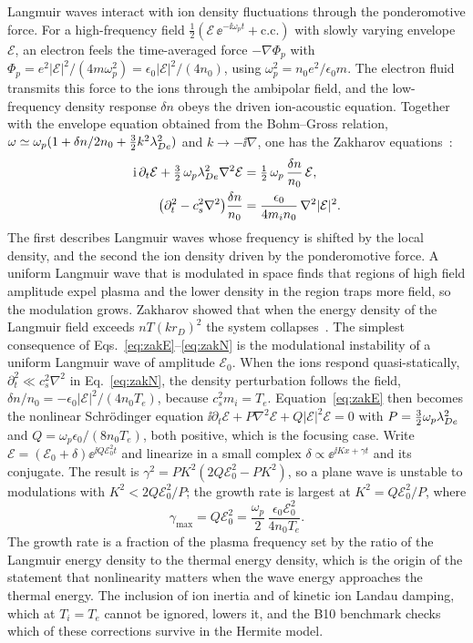 Langmuir waves interact with ion density fluctuations through the ponderomotive force. For a high-frequency field $\tfrac12(\mathcal E\,\ee^{-\ii\omega_pt}+\mathrm{c.c.})$ with slowly varying envelope $\mathcal E$, an electron feels the time-averaged force $-\nabla\Phi_p$ with $\Phi_p=e^2|\mathcal E|^2/(4m\omega_p^2)=\epsilon_0|\mathcal E|^2/(4n_0)$, using $\omega_p^2=n_0e^2/\epsilon_0m$. The electron fluid transmits this force to the ions through the ambipolar field, and the low-frequency density response $\delta n$ obeys the driven ion-acoustic equation. Together with the envelope equation obtained from the Bohm--Gross relation, $\omega\simeq\omega_p(1+\delta n/2n_0+\tfrac32k^2\lambda_{De}^2)$ and $k\to-\ii\nabla$, one has the Zakharov equations~\citep{Zakharov1972}:
\begin{align}
\mathrm{i}\,\partial_t\mathcal E+\tfrac32\,\omega_p\lambda_{De}^2\nabla^2\mathcal E&=\tfrac12\,\omega_p\,\frac{\delta n}{n_0}\,\mathcal E ,\label{eq:zakE}\\
\big(\partial_t^2-c_s^2\nabla^2\big)\frac{\delta n}{n_0}&=\frac{\epsilon_0}{4m_in_0}\,\nabla^2|\mathcal E|^2 .\label{eq:zakN}
\end{align}
The first describes Langmuir waves whose frequency is shifted by the local density, and the second the ion density driven by the ponderomotive force. A uniform Langmuir wave that is modulated in space finds that regions of high field amplitude expel plasma and the lower density in the region traps more field, so the modulation grows. Zakharov showed that when the energy density of the Langmuir field exceeds $nT(k r_D)^2$ the system collapses~\citep{Zakharov1972}. The simplest consequence of Eqs.~\eqref{eq:zakE}--\eqref{eq:zakN} is the modulational instability of a uniform Langmuir wave of amplitude $\mathcal E_0$. When the ions respond quasi-statically, $\partial_t^2\ll c_s^2\nabla^2$ in Eq.~\eqref{eq:zakN}, the density perturbation follows the field, $\delta n/n_0=-\epsilon_0|\mathcal E|^2/(4n_0T_e)$, because $c_s^2m_i=T_e$. Equation~\eqref{eq:zakE} then becomes the nonlinear Schr\"odinger equation $\ii\partial_t\mathcal E+P\nabla^2\mathcal E+Q|\mathcal E|^2\mathcal E=0$ with $P=\tfrac32\omega_p\lambda_{De}^2$ and $Q=\omega_p\epsilon_0/(8n_0T_e)$, both positive, which is the focusing case. Write $\mathcal E=(\mathcal E_0+\delta)\ee^{\ii Q\mathcal E_0^2t}$ and linearize in a small complex $\delta\propto\ee^{\ii Kx+\gamma t}$ and its conjugate. The result is $\gamma^2=P K^2(2Q\mathcal E_0^2-PK^2)$, so a plane wave is unstable to modulations with $K^2<2Q\mathcal E_0^2/P$; the growth rate is largest at $K^2=Q\mathcal E_0^2/P$, where
\begin{equation}
\gamma_{\max}=Q\mathcal E_0^2=\frac{\omega_p}{2}\,\frac{\epsilon_0\mathcal E_0^2}{4n_0T_e} .
\end{equation}
The growth rate is a fraction of the plasma frequency set by the ratio of the Langmuir energy density to the thermal energy density, which is the origin of the statement that nonlinearity matters when the wave energy approaches the thermal energy. The inclusion of ion inertia and of kinetic ion Landau damping, which at $T_i=T_e$ cannot be ignored, lowers it, and the B10 benchmark checks which of these corrections survive in the Hermite model.

